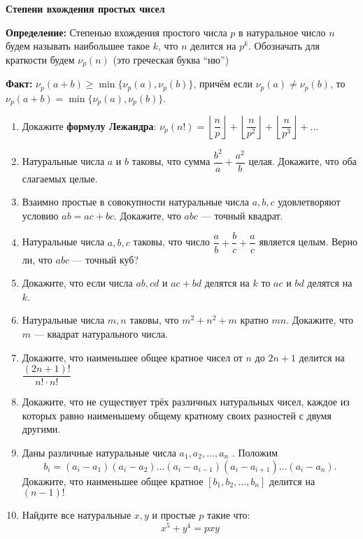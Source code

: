 \documentclass{article}
\begin{document}
\large
	
\begin{center}
	\textbf{Степени вхождения простых чисел}
\end{center}

\textbf{Определение:} Степенью вхождения простого числа $p$ в натуральное число $n$ будем называть наибольшее такое $k$, что $n$ делится на $p^k$. Обозначать для краткости будем $\nu_p(n)$ (это греческая буква “ню”)

\textbf{Факт:}  $\nu_p(a + b) \ge \min\{\nu_p(a),\nu_p(b)\}$, причём если $\nu_p(a) \neq \nu_p(b)$, то $\nu_p(a + b) = \min\{\nu_p (a), \nu_p (b)\}$.

\begin{enumerate}[label*=\protect\fbox{\arabic{enumi}}]
	
\item Докажите \textbf{формулу Лежандра}: $\nu_p(n!)=\left\lfloor \dfrac{n}{p}\right\rfloor+\left\lfloor \dfrac{n}{p^2} \right\rfloor+\left\lfloor \dfrac{n}{p^3} \right\rfloor+...$

\item Натуральные числа $a$ и $b$ таковы, что сумма $\dfrac{b^2}{a} + \dfrac{a^2}{b}$ целая. Докажите, что оба слагаемых целые.
\item Взаимно простые в совокупности натуральные числа $a, b, c$ удовлетворяют условию
$ab = ac + bc$. Докажите, что $abc$ — точный квадрат.
\item Натуральные числа $a, b, c$ таковы, что число $\dfrac{a}{b} + \dfrac{b}{c} + \dfrac{a}{c}$ является целым. Верно ли,
что $abc$ — точный куб?
\item Докажите, что если числа $ab, cd$ и $ac + bd$ делятся на $k$ то $ac$ и $bd$ делятся на $k$.
\item Натуральные числа $m, n$ таковы, что $m^2 + n^2 + m$ кратно $mn$. Докажите, что $m$ — квадрат натурального числа.
\item Докажите, что наименьшее общее кратное чисел от $n$ до $2n + 1$ делится на $\dfrac{(2n + 1)!}{n!\cdot n!}$
\item Докажите, что не существует трёх различных натуральных чисел, каждое из которых равно наименьшему общему кратному своих разностей с двумя другими.
\item Даны различные натуральные числа $a_1 , a_2 , \dotsc , a_n$ . Положим
$$b_i = (a_i - a_1)(a_i - a_2)\dotsc(a_i - a_{i-1})(a_i - a_{i+1})\dotsc(a_i - a_n).$$
Докажите, что наименьшее общее кратное $[b_1 , b_2 , \dotsc , b_n ]$ делится на $(n - 1)!$
\item Найдите все натуральные $x, y$ и простые $p$ такие что:
$$x^5 + y^4 = pxy$$
\end{enumerate}
\end{document}
